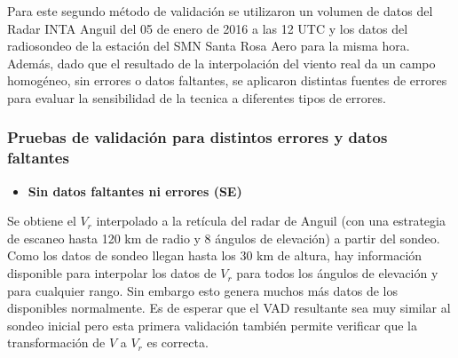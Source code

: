 \documentclass[12pt,spanish,oneside, a4paper]{book}
\providecommand{\tightlist}{%
  \setlength{\itemsep}{0pt}\setlength{\parskip}{0pt}}
\begin{document}
Para este segundo método de validación se utilizaron un volumen de datos
del Radar INTA Anguil del 05 de enero de 2016 a las 12 UTC y los datos
del radiosondeo de la estación del SMN Santa Rosa Aero para la misma
hora. Además, dado que el resultado de la interpolación del viento real
da un campo homogéneo, sin errores o datos faltantes, se aplicaron
distintas fuentes de errores para evaluar la sensibilidad de la tecnica
a diferentes tipos de errores.

\subsubsection{Pruebas de validación para distintos errores y datos
faltantes}\label{pruebas-de-validacion-para-distintos-errores-y-datos-faltantes}

\begin{itemize}
\tightlist
\item
  \textbf{Sin datos faltantes ni errores (SE)}
\end{itemize}

Se obtiene el \(V_r\) interpolado a la retícula del radar de Anguil (con
una estrategia de escaneo hasta 120 km de radio y 8 ángulos de
elevación) a partir del sondeo. Como los datos de sondeo llegan hasta
los 30 km de altura, hay información disponible para interpolar los
datos de \(V_r\) para todos los ángulos de elevación y para cualquier
rango. Sin embargo esto genera muchos más datos de los disponibles
normalmente. Es de esperar que el VAD resultante sea muy similar al
sondeo inicial pero esta primera validación también permite verificar
que la transformación de \(V\) a \(V_r\) es correcta.
\end{document}
